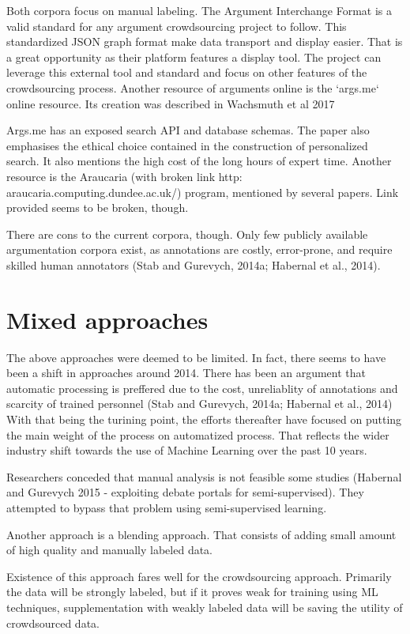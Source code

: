 \documentclass{report}
\begin{document}
Both corpora focus on manual labeling.
The Argument Interchange Format is a valid standard for any argument crowdsourcing project to follow.  This standardized JSON graph format make data transport and display easier. That is a great opportunity as their platform features a display tool.  The project can leverage this external tool and standard and focus on other features of the crowdsourcing process.
Another resource of arguments online is the `args.me` online resource. 
Its creation was described in Wachsmuth et al 2017

Args.me has an exposed search API and database schemas. The paper also emphasises the ethical choice contained in the construction of personalized search.
It also mentions the high cost of the long hours of expert time.
Another resource is the  Araucaria (with broken link  http:\\araucaria.computing.dundee.ac.uk/) program, mentioned by several papers. Link provided seems to be broken, though. 

There are cons to the current corpora, though.
Only few publicly available argumentation corpora exist, as annotations are costly, error-prone, and require skilled human annotators (Stab and Gurevych, 2014a; Habernal et al., 2014).

\section{Mixed approaches}
The above approaches were deemed to be limited. In fact, there seems to have been a shift in approaches around 2014.
There has been an argument that automatic processing is preffered due to the cost, unreliablity of annotations and scarcity of trained personnel
(Stab and Gurevych, 2014a; Habernal et al., 2014)
With that being the turining point, the efforts thereafter have focused on putting the main weight of the process on automatized process. 
That reflects the wider industry shift towards the use of Machine Learning over the past 10 years.

Researchers conceded that manual analysis is not feasible some studies (Habernal and Gurevych 2015 - exploiting debate portals for semi-supervised).
They attempted to bypass that problem using semi-supervised learning.

Another approach is a blending approach.\cite{shnarch_will_2018} That consists of adding small amount of high quality and manually labeled data.

Existence of this approach fares well for the crowdsourcing approach. Primarily the data will be strongly labeled, but if it proves weak for training using ML techniques, 
supplementation with weakly labeled data will be saving the utility of crowdsourced data.
\end{document}
